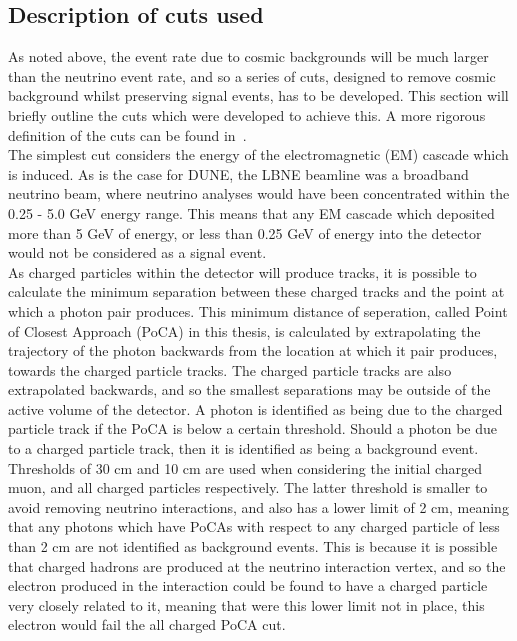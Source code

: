 \subsection{Description of cuts used} \label{sec:SurfCutList}
As noted above, the event rate due to cosmic backgrounds will be much larger than the neutrino event rate, and so a series of cuts, designed to remove cosmic background whilst preserving signal events, has to be developed. This section will briefly outline the cuts which were developed to achieve this. A more rigorous definition of the cuts can be found in~\citep{MartinsThesis}. \\

The simplest cut considers the energy of the electromagnetic (EM) cascade which is induced. As is the case for DUNE, the LBNE beamline was a broadband neutrino beam, where neutrino analyses would have been concentrated within the 0.25 - 5.0 GeV energy range. This means that any EM cascade which deposited more than 5 GeV of energy, or less than 0.25 GeV of energy into the detector would not be considered as a signal event. \\

As charged particles within the detector will produce tracks, it is possible to calculate the minimum separation between these charged tracks and the point at which a photon pair produces. This minimum distance of seperation, called Point of Closest Approach (PoCA) in this thesis, is calculated by extrapolating the trajectory of the photon backwards from the location at which it pair produces, towards the charged particle tracks. The charged particle tracks are also extrapolated backwards, and so the smallest separations may be outside of the active volume of the detector. A photon is identified as being due to the charged particle track if the PoCA is below a certain threshold. Should a photon be due to a charged particle track, then it is identified as being a background event. Thresholds of 30 cm and 10 cm are used when considering the initial charged muon, and all charged particles respectively. The latter threshold is smaller to avoid removing neutrino interactions, and also has a lower limit of 2 cm, meaning that any photons which have PoCAs with respect to any charged particle of less than 2 cm are not identified as background events. This is because it is possible that charged hadrons are produced at the neutrino interaction vertex, and so the electron produced in the interaction could be found to have a charged particle very closely related to it, meaning that were this lower limit not in place, this electron would fail the all charged PoCA cut. \\ 

